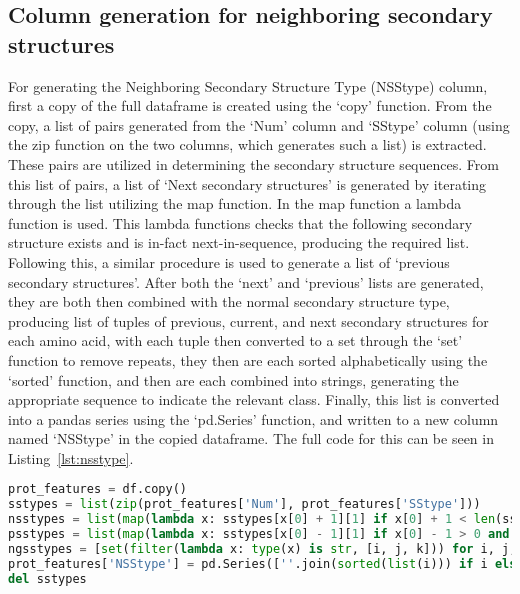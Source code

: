\documentclass[12pt,letterpaper,oneside,reqno]{book}
\theoremstyle{plain}
\theoremstyle{definition}
\theoremstyle{plain}
\theoremstyle{remark}
\theoremstyle{plain}
\theoremstyle{definition}
\theoremstyle{plain}
\begin{document}
\subsection{Column generation for neighboring secondary structures} %
\label{NSStype}
For generating the Neighboring Secondary Structure Type (NSStype) column, first a copy of the full dataframe is created using the `copy' function. From the copy, a list of pairs generated from the `Num' column and `SStype' column (using the zip function on the two columns, which generates such a list) is extracted. These pairs are utilized in determining the secondary structure sequences.
From this list of pairs, a list of `Next secondary structures' is generated by iterating through the list utilizing the map function. In the map function a lambda function is used. This lambda functions checks that the following secondary structure exists and is in-fact next-in-sequence, producing the required list. Following this, a similar procedure is used to generate a list of `previous secondary structures'. After both the `next' and `previous' lists are generated, they are both then combined with the normal secondary structure type, producing list of tuples of previous, current, and next secondary structures for each amino acid, with each tuple then converted to a set through the `set' function to remove repeats, they then are each sorted alphabetically using the `sorted' function, and then are each combined into strings, generating the appropriate sequence to indicate the relevant class. Finally, this list is converted into a pandas series using the `pd.Series' function, and written to a new column named `NSStype' in the copied dataframe. The full code for this can be seen in Listing~\ref{lst:nsstype}.
\begin{lstlisting}[language=Python, caption={Code for Generation of the `NSStype' Column}, label = lst:nsstype, frame=single]
prot_features = df.copy()
sstypes = list(zip(prot_features['Num'], prot_features['SStype']))
nsstypes = list(map(lambda x: sstypes[x[0] + 1][1] if x[0] + 1 < len(sstypes) and sstypes[x[0] + 1][0] == x[1][0] + 1 else np.nan, enumerate(sstypes)))
psstypes = list(map(lambda x: sstypes[x[0] - 1][1] if x[0] - 1 > 0 and sstypes[x[0] - 1][0] == x[1][0] - 1 else np.nan, enumerate(sstypes)))
ngsstypes = [set(filter(lambda x: type(x) is str, [i, j, k])) for i, j, k in zip(nsstypes, psstypes, (l for _, l in sstypes))]
prot_features['NSStype'] = pd.Series([''.join(sorted(list(i))) if i else np.nan for i in ngsstypes])
del sstypes
\end{lstlisting}
\end{document}
